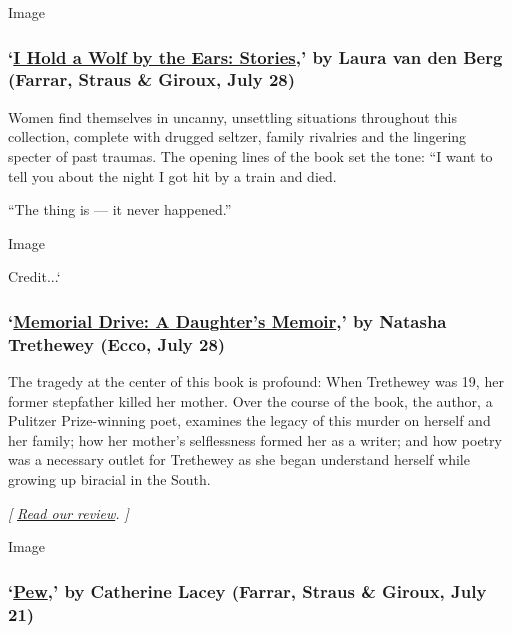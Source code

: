 Image

\hypertarget{i-hold-a-wolf-by-the-ears-stories-by-laura-van-den-berg-farrar-straus--giroux-july-28}{%
\subsubsection{\texorpdfstring{`\href{https://us.macmillan.com/books/9780374102098}{I
Hold a Wolf by the Ears: Stories},' by Laura van den Berg (Farrar,
Straus \& Giroux, July
28)}{`I Hold a Wolf by the Ears: Stories,' by Laura van den Berg (Farrar, Straus \& Giroux, July 28)}}\label{i-hold-a-wolf-by-the-ears-stories-by-laura-van-den-berg-farrar-straus--giroux-july-28}}

Women find themselves in uncanny, unsettling situations throughout this
collection, complete with drugged seltzer, family rivalries and the
lingering specter of past traumas. The opening lines of the book set the
tone: ``I want to tell you about the night I got hit by a train and
died.

``The thing is --- it never happened.''

Image

Credit...`

\hypertarget{memorial-drive-a-daughters-memoir-by-natasha-trethewey-ecco-july-28}{%
\subsubsection{\texorpdfstring{`\href{https://www.harpercollins.com/9780062248572/memorial-drive/}{Memorial
Drive: A Daughter's Memoir},' by Natasha Trethewey (Ecco, July
28)}{`Memorial Drive: A Daughter's Memoir,' by Natasha Trethewey (Ecco, July 28)}}\label{memorial-drive-a-daughters-memoir-by-natasha-trethewey-ecco-july-28}}

The tragedy at the center of this book is profound: When Trethewey was
19, her former stepfather killed her mother. Over the course of the
book, the author, a Pulitzer Prize-winning poet, examines the legacy of
this murder on herself and her family; how her mother's selflessness
formed her as a writer; and how poetry was a necessary outlet for
Trethewey as she began understand herself while growing up biracial in
the South.

\emph{{[}}
\href{https://www.nytimes.com/2020/07/27/books/review-memorial-drive-memoir-natasha-trethewey.html}{\emph{Read
our review}}\emph{. {]}}

Image

\hypertarget{pew-by-catherine-lacey-farrar-straus--giroux-july-21}{%
\subsubsection{\texorpdfstring{`\href{https://us.macmillan.com/books/9780374230920}{Pew},'
by Catherine Lacey (Farrar, Straus \& Giroux, July
21)}{`Pew,' by Catherine Lacey (Farrar, Straus \& Giroux, July 21)}}\label{pew-by-catherine-lacey-farrar-straus--giroux-july-21}}

